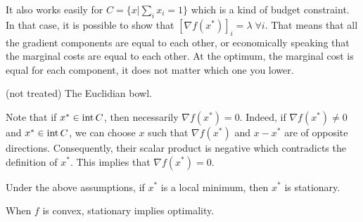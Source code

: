 \begin{example}
\begin{leftbar}
It also works easily for $C = \{x|\sum_{i}x_i=1\}$ which is a kind of budget constraint. In that case, it is possible to show that $[\nabla f(x^*)]_i = \lambda \; \forall i$. That means that all the gradient components are equal to each other, or economically speaking that the marginal costs are equal to each other. At the optimum, the marginal cost is equal for each component, it does not matter which one you lower.
\end{leftbar}
\end{example}

\begin{example}
\begin{leftbar}
(not treated) The Euclidian bowl.
\end{leftbar}
\end{example}


Note that if $x^* \in \mathrm{int}\, C$, then necessarily $\nabla f(x^*) = 0$.
Indeed, if $\nabla f(x^*) \neq 0$ and $x^* \in \mathrm{int}\, C$, we can choose $x$ such that $\nabla f(x^*)$ and $x-x^*$ are of opposite directions. Consequently, their scalar product is negative which contradicts the definition of $x^*$. This implies that $\nabla f(x^*) = 0$.

\begin{theorem}
Under the above assumptions, if $x^*$ is a local minimum, then $x^*$ is stationary.
\end{theorem}

\begin{theorem}
When $f$ is convex, stationary implies optimality.
\end{theorem}



